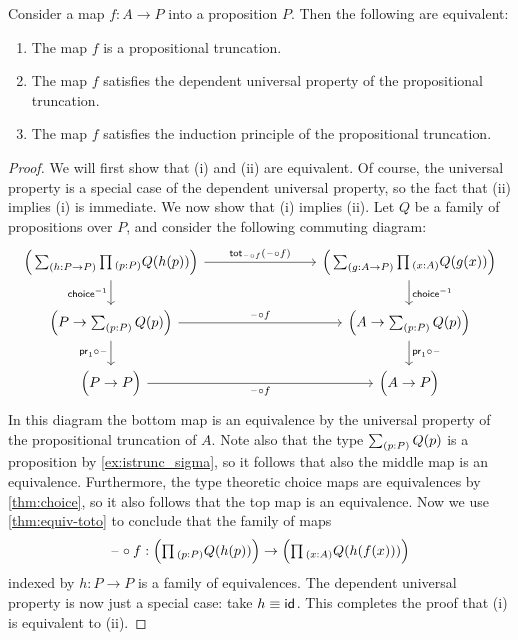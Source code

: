\begin{thm}
  Consider a map $f:A\to P$ into a proposition $P$. Then the following are equivalent:
  \begin{enumerate}
  \item The map $f$ is a propositional truncation.
  \item The map $f$ satisfies the dependent universal property of the propositional truncation.
  \item The map $f$ satisfies the induction principle of the propositional truncation.
  \end{enumerate}
\end{thm}

\begin{proof}
  We will first show that (i) and (ii) are equivalent. Of course, the universal property is a special case of the dependent universal property, so the fact that (ii) implies (i) is immediate. We now show that (i) implies (ii). Let $Q$ be a family of propositions over $P$, and consider the following commuting diagram:
  \begin{equation*}
    \begin{tikzcd}[column sep=8em]
      \Big(\sm{h:P\to P}\prd{p:P}Q(h(p))\Big) \arrow[r,"{\tot[\blank\circ f]{\blank\circ f}}"] \arrow[d,swap,"\choice^{-1}"] & \Big(\sm{g:A\to P}\prd{x:A}Q(g(x))\Big) \arrow[d,"\choice^{-1}"] \\
      \Big(P\to \sm{p:P}Q(p)\Big) \arrow[r,"\blank\circ f"] \arrow[d,swap,"\proj 1\circ\blank"]  & \Big(A \to \sm{p:P}Q(p)\Big) \arrow[d,"\proj 1\circ\blank"] \\
      \Big(P\to P\Big) \arrow[r,swap,"\blank\circ f"] & \Big(A\to P\Big)
    \end{tikzcd}
  \end{equation*}
  In this diagram the bottom map is an equivalence by the universal property of the propositional truncation of $A$. Note also that the type $\sm{p:P}Q(p)$ is a proposition by \cref{ex:istrunc_sigma}, so it follows that also the middle map is an equivalence. Furthermore, the type theoretic choice maps are equivalences by \cref{thm:choice}, so it also follows that the top map is an equivalence. Now we use \cref{thm:equiv-toto} to conclude that the family of maps
  \begin{equation*}
    \blank\circ f: \Big(\prd{p:P}Q(h(p))\Big)\to\Big(\prd{x:A}Q(h(f(x)))\Big)
  \end{equation*}
  indexed by $h:P\to P$ is a family of equivalences. The dependent universal property is now just a special case: take $h\equiv\mathsf{id}_{}$. This completes the proof that (i) is equivalent to (ii).


\end{proof}
